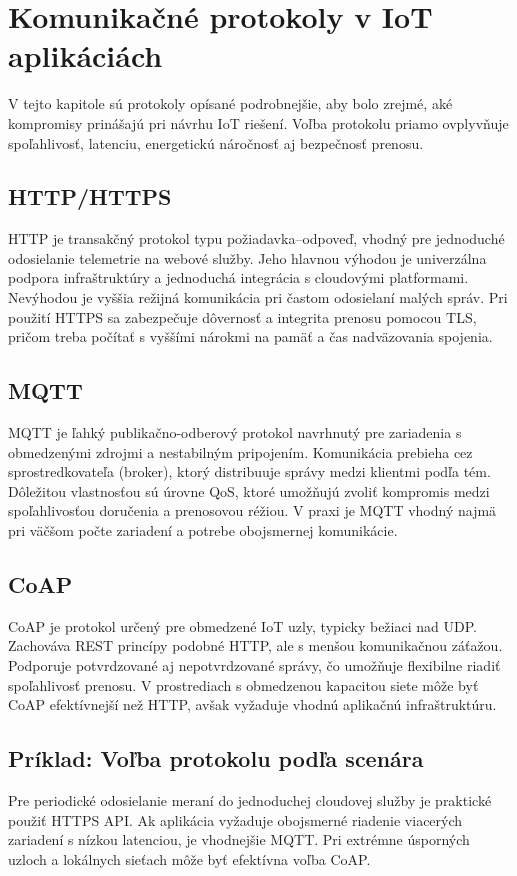 \section{Komunikačné protokoly v IoT aplikáciách}
V tejto kapitole sú protokoly opísané podrobnejšie, aby bolo zrejmé, aké kompromisy prinášajú pri návrhu IoT riešení. Voľba protokolu priamo ovplyvňuje spoľahlivosť, latenciu, energetickú náročnosť aj bezpečnosť prenosu.

\subsection{HTTP/HTTPS}
HTTP je transakčný protokol typu požiadavka--odpoveď, vhodný pre jednoduché odosielanie telemetrie na webové služby. Jeho hlavnou výhodou je univerzálna podpora infraštruktúry a jednoduchá integrácia s cloudovými platformami. Nevýhodou je vyššia režijná komunikácia pri častom odosielaní malých správ. Pri použití HTTPS sa zabezpečuje dôvernosť a integrita prenosu pomocou TLS, pričom treba počítať s vyššími nárokmi na pamäť a čas nadväzovania spojenia.

\subsection{MQTT}
MQTT je ľahký publikačno-odberový protokol navrhnutý pre zariadenia s obmedzenými zdrojmi a nestabilným pripojením. Komunikácia prebieha cez sprostredkovateľa (broker), ktorý distribuuje správy medzi klientmi podľa tém. Dôležitou vlastnosťou sú úrovne QoS, ktoré umožňujú zvoliť kompromis medzi spoľahlivosťou doručenia a prenosovou réžiou. V praxi je MQTT vhodný najmä pri väčšom počte zariadení a potrebe obojsmernej komunikácie.

\subsection{CoAP}
CoAP je protokol určený pre obmedzené IoT uzly, typicky bežiaci nad UDP. Zachováva REST princípy podobné HTTP, ale s menšou komunikačnou záťažou. Podporuje potvrdzované aj nepotvrdzované správy, čo umožňuje flexibilne riadiť spoľahlivosť prenosu. V prostrediach s obmedzenou kapacitou siete môže byť CoAP efektívnejší než HTTP, avšak vyžaduje vhodnú aplikačnú infraštruktúru.

\subsection{Príklad: Voľba protokolu podľa scenára}
Pre periodické odosielanie meraní do jednoduchej cloudovej služby je praktické použiť HTTPS API. Ak aplikácia vyžaduje obojsmerné riadenie viacerých zariadení s nízkou latenciou, je vhodnejšie MQTT. Pri extrémne úsporných uzloch a lokálnych sieťach môže byť efektívna voľba CoAP.

